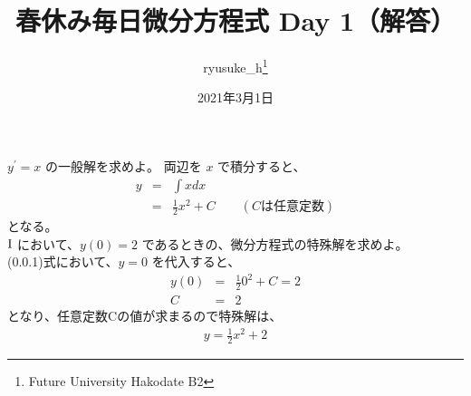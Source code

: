 \documentclass[a4j]{jsarticle}
\title{春休み毎日微分方程式 Day 1（解答）}
\author{ryusuke\_h\thanks{Future University Hakodate B2}}
\date{2021年3月1日}
\begin{document}
\maketitle

\begin{qparts}
    \qpart $ y ^ {\prime} = x $ の一般解を求めよ。
    両辺を $ x $ で積分すると、\\
    \begin{eqnarray}
      y & = & \int x dx \nonumber \\
      & = & \frac{1}{2} x ^ 2 + C \qquad (Cは任意定数)
    \end{eqnarray}
    となる。\\

    \qpart $ \rm I $ において、$ y(0) = 2 $ であるときの、微分方程式の特殊解を求めよ。\\
    (0.0.1)式において、$ y = 0 $ を代入すると、
    \begin{eqnarray}
      y(0) & = & \frac{1}{2} 0 ^ 2 + C = 2 \nonumber \\
      C & = & 2 \nonumber
    \end{eqnarray}
    となり、任意定数Cの値が求まるので特殊解は、
    \begin{align*}
      y = \frac{1}{2} x ^ 2 + 2
    \end{align*}
\end{qparts}
\end{document}
